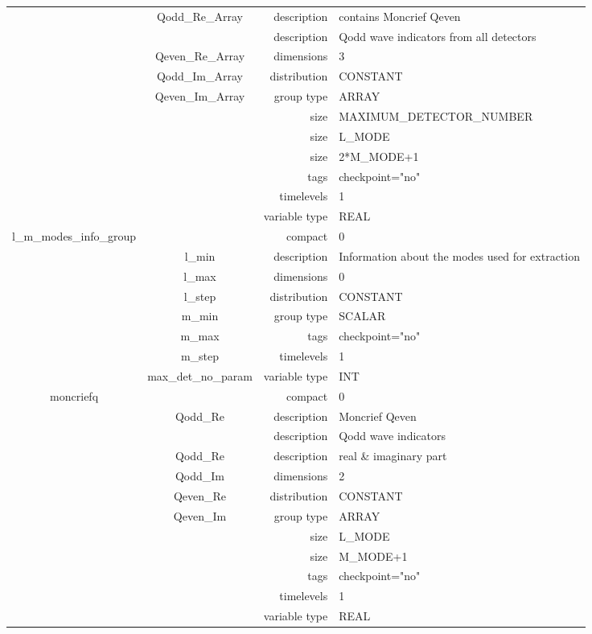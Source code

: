 \begin{tabular*}{150mm}{|c|c@{\extracolsep{\fill}}|rl|}
 & Qodd\_Re\_Array & description & contains Moncrief Qeven \\ 
& ~ & description &  Qodd wave indicators from all detectors \\ 
 & Qeven\_Re\_Array & dimensions & 3 \\ 
 & Qodd\_Im\_Array & distribution & CONSTANT \\ 
 & Qeven\_Im\_Array & group type & ARRAY \\ 
 &  & size & MAXIMUM\_DETECTOR\_NUMBER \\ 
& ~ & size & L\_MODE \\ 
 &  & size & 2*M\_MODE+1 \\ 
 &  & tags & checkpoint="no" \\ 
 &  & timelevels & 1 \\ 
 &  & variable type & REAL \\ 
\hline 
l\_m\_modes\_info\_group &  & compact & 0 \\ 
 & l\_min & description & Information about the modes used for extraction \\ 
 & l\_max & dimensions & 0 \\ 
 & l\_step & distribution & CONSTANT \\ 
 & m\_min & group type & SCALAR \\ 
 & m\_max & tags & checkpoint="no" \\ 
 & m\_step & timelevels & 1 \\ 
 & max\_det\_no\_param & variable type & INT \\ 
\hline 
moncriefq &  & compact & 0 \\ 
 & Qodd\_Re & description & Moncrief Qeven \\ 
& ~ & description &  Qodd wave indicators \\ 
 & Qodd\_Re & description &  real \& imaginary part \\ 
 & Qodd\_Im & dimensions & 2 \\ 
 & Qeven\_Re & distribution & CONSTANT \\ 
 & Qeven\_Im & group type & ARRAY \\ 
 &  & size & L\_MODE \\ 
& ~ & size & M\_MODE+1 \\ 
 &  & tags & checkpoint="no" \\ 
 &  & timelevels & 1 \\ 
 &  & variable type & REAL \\ 
\hline 
\end{tabular*} 



